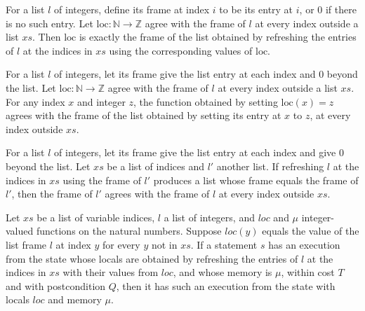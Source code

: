 \begin{theorem}
\label{Light.LocalsBut.eq_frame}
\leanok
{}
For a list $l$ of integers, define its frame at index $i$ to be its entry at $i$, or $0$
if there is no such entry. Let $\mathrm{loc}:\mathbb N\to\mathbb Z$ agree with the frame
of $l$ at every index outside a list $xs$. Then $\mathrm{loc}$ is exactly the frame of
the list obtained by refreshing the entries of $l$ at the indices in $xs$ using the
corresponding values of $\mathrm{loc}$.
\end{theorem}

\begin{theorem}
\label{Light.LocalsBut.update}
\leanok
{}
For a list $l$ of integers, let its frame give the list entry at each index and $0$
beyond the list. Let $\mathrm{loc}:\mathbb N\to\mathbb Z$ agree with the frame of $l$ at
every index outside a list $xs$. For any index $x$ and integer $z$, the function
obtained by setting $\mathrm{loc}(x)=z$ agrees with the frame of the list obtained by
setting its entry at $x$ to $z$, at every index outside $xs$.
\end{theorem}

\begin{theorem}
\label{Light.LocalsBut.of_eq}
\leanok
{}
For a list $l$ of integers, let its frame give the list entry at each index and give $0$
beyond the list. Let $xs$ be a list of indices and $l'$ another list. If refreshing $l$
at the indices in $xs$ using the frame of $l'$ produces a list whose frame equals the
frame of $l'$, then the frame of $l'$ agrees with the frame of $l$ at every index
outside $xs$.
\end{theorem}

\begin{theorem}
\label{Light.Ends.asFrame}
\leanok
{}
Let $xs$ be a list of variable indices, $l$ a list of integers, and $loc$ and $\mu$
integer-valued functions on the natural numbers. Suppose $loc(y)$ equals the value of
the list frame $l$ at index $y$ for every $y$ not in $xs$. If a statement $s$ has an
execution from the state whose locals are obtained by refreshing the entries of $l$ at
the indices in $xs$ with their values from $loc$, and whose memory is $\mu$, within cost
$T$ and with postcondition $Q$, then it has such an execution from the state with locals
$loc$ and memory $\mu$.
\end{theorem}

